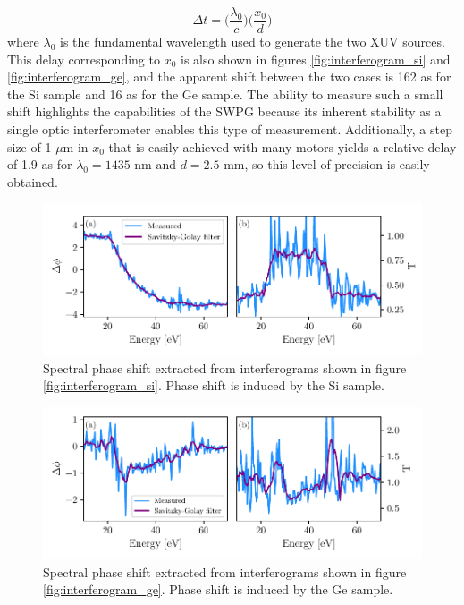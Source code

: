 \begin{equation}
	\label{eqn:phase_to_delay}
	\Delta t  = \bigg(\frac{\lambda_0}{c}\bigg)\bigg(\frac{x_0}{d}\bigg)
\end{equation}
where $\lambda_0$ is the fundamental wavelength used to generate the two XUV sources. This delay corresponding to $x_0$ is also shown in figures \ref{fig:interferogram_si} and \ref{fig:interferogram_ge}, and the apparent shift between the two cases is 162 as for the Si sample and 16 as for the Ge sample.  The ability to measure such a small shift highlights the capabilities of the SWPG because its inherent stability as a single optic interferometer enables this type of measurement.  Additionally, a step size of 1 $\mu$m in $x_0$ that is easily achieved with many motors yields a relative delay of 1.9 as for $\lambda_0=1435$ nm and $d=2.5$ mm, so this level of precision is easily obtained. 

\begin{figure}
	\centering
	\includegraphics[width=1.0\textwidth]{figures/refractive_index/FTS_delta.pdf}
	\caption[Measured phase shift using SWPG FTS in silicon]{Spectral phase shift extracted from interferograms shown in figure \ref{fig:interferogram_si}. Phase shift is induced by the Si sample.}
	\label{fig:FTS_phase_si}
\end{figure}

\begin{figure}
	\centering
	\includegraphics[width=1.0\textwidth]{figures/refractive_index/FTS_delta_ge.pdf}
	\caption[Measured phase shift using SWPG FTS in germanium]{Spectral phase shift extracted from interferograms shown in figure \ref{fig:interferogram_ge}. Phase shift is induced by the Ge sample.}
	\label{fig:FTS_phase_ge}
\end{figure}

